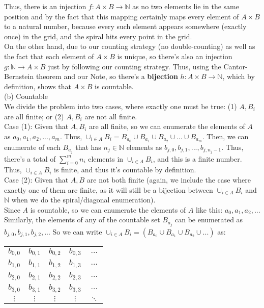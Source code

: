 \documentclass{article}
\begin{document}
Thus, there is an injection $f:A\times B\rightarrow\mathbb{N}$ as no two elements lie in the same position and by the fact that this mapping certainly maps every element of $A\times B$ to a natural number, because every such element appears somewhere (exactly once) in the grid, and the spiral hits every point in the grid. \\[.2cm]
\indent On the other hand, due to our counting strategy (no double-counting) as well as the fact that each element of $A\times B$ is unique, so there's also an injection $g:\mathbb{N}\rightarrow A\times B$ just by following our counting strategy. Thus, using the Cantor-Bernstein theorem and our Note, so there's a \textbf{bijection} $h:A\times B\rightarrow\mathbb{N}$, which by definition, shows that $A\times B$ is countable. \pagebreak\\
(b) Countable \\

We divide the problem into two cases, where exactly one must be true: (1) $A, B_i$ are all finite; or (2) $A, B_i$ are not all finite. \\

Case (1): Given that $A, B_i$ are all finite, so we can enumerate the elements of $A$ as $a_0, a_1, a_2, ..., a_m$. Thus, $\cup_{i\in A}B_i = B_{a_0}\cup B_{a_1}\cup B_{a_2}\cup ...\cup B_{a_m}$. Then, we can enumerate of each $B_{a_j}$ that has $n_j\in\mathbb{N}$ elements as $b_{j,0}, b_{j,1}, ..., b_{j,n_j-1}$. Thus, there's a total of $\sum\limits_{i=0}^m n_i$ elements in $\cup_{i\in A}B_i$, and this is a finite number. Thus, $\cup_{i\in A}B_i$ is finite, and thus it's countable by definition. \\

Case (2): Given that $A, B$ are not both finite (again, we include the case where exactly one of them are finite, as it will still be a bijection between $\cup_{i\in A}B_i$ and $\mathbb{N}$ when we do the spiral/diagonal enumeration). \\[.2cm]
\indent Since $A$ is countable, so we can enumerate the elements of $A$ like this: $a_0, a_1, a_2, ...$ Similarly, the elements of any of the countable set $B_{a_j}$ can be enumerated as $b_{j,0}, b_{j,1}, b_{j,2}, ...$ So we can write $\cup_{i\in A}B_i = (B_{a_0}\cup B_{a_1}\cup B_{a_2}\cup ...)$ as:
\begin{center}
\begin{tabular} { c c c c c }
    $b_{0,0}$ & $b_{0,1}$ & $b_{0,2}$ & $b_{0,3}$ & $\dots$ \\
    $b_{1,0}$ & $b_{1,1}$ & $b_{1,2}$ & $b_{1,3}$ & $\dots$ \\
    $b_{2,0}$ & $b_{2,1}$ & $b_{2,2}$ & $b_{2,3}$ & $\dots$ \\
    $b_{3,0}$ & $b_{3,1}$ & $b_{3,2}$ & $b_{3,3}$ & $\dots$ \\
    $\vdots$ & $\vdots$ & $\vdots$ & $\vdots$ & $\ddots$
\end{tabular}
\end{center}
\end{document}
